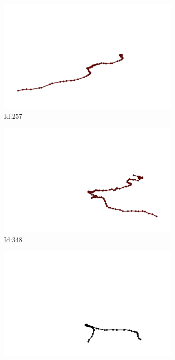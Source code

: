 \documentclass[12pt,twoside]{report}
\begin{document}
\begin{figure}
\centering
\begin{subfigure}[b]{0.20\textwidth}
\centering
\includegraphics[width=\textwidth]{../../trajectories/257.png}
\caption{Id:257}
\end{subfigure}
\begin{subfigure}[b]{0.20\textwidth}
\centering
\includegraphics[width=\textwidth]{../../trajectories/348.png}
\caption{Id:348}
\end{subfigure}
\begin{subfigure}[b]{0.20\textwidth}
\centering
\includegraphics[width=\textwidth]{../../trajectories/420.png}

\end{subfigure}
\end{figure}
\end{document}
